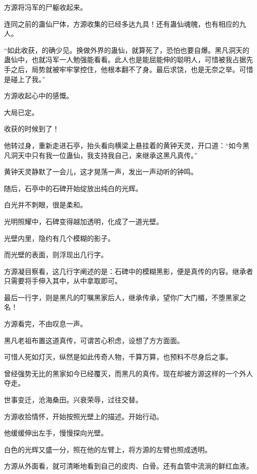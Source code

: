 
\begin{this_body}



方源将冯军的尸躯收起来。

连同之前的蛊仙尸体，方源收集的已经多达九具！还有蛊仙魂魄，也有相应的九人。

“如此收获，的确少见。换做外界的蛊仙，就算死了，恐怕也要自爆。黑凡洞天的蛊仙中，也就冯军一人勉强能看看。此人也是能屈能伸的聪明人，可惜被我占据先手之后，局势就被牢牢掌控住，他根本翻不了身。最后求饶，也是无奈之举。可惜是碰上了我。”

方源收起心中的感慨。

大局已定。

收获的时候到了！

他转过身，重新走进石亭，抬头看向横梁上悬挂着的黄钟天灵，开口道：“如今黑凡洞天中只有我一位蛊仙，我支持我自己，来继承这黑凡真传。”

黄钟天灵静默了一会儿，这才晃荡一声，发出一声动听的钟鸣。

随后，石亭中的石碑开始绽放出纯白的光辉。

白光并不刺眼，很是柔和。

光明照耀中，石碑变得越加透明，化成了一道光壁。

光壁内里，隐约有几个模糊的影子。

而光壁的表面，则浮现出几行字。

方源凝目察看，这几行字阐述的是：石碑中的模糊黑影，便是真传的内容。继承者只需要将手伸入其中，从中拿取即可。

最后一行字，则是黑凡的叮嘱黑家后人，继承传承，望你广大门楣，不堕黑家之名！

方源看完，不由叹息一声。

黑凡老祖布置这道真传，可谓苦心积虑，设想了方方面面。

可惜人死如灯灭，纵然是如此传奇人物，千算万算，也预料不尽身后之事。

曾经强势无比的黑家如今已经覆灭，而黑凡的真传。现在却被方源这样的一个外人夺走。

世事变迁，沧海桑田。兴衰荣辱，过往交替。

方源收拾情怀，开始按照光壁上的描述。开始行动。

他缓缓伸出左手，慢慢探向光壁。

白色的光辉又盛一分，照在他的左臂上，将方源的左臂也照成透明。

方源从外面看，就可清晰地看到自己的皮肉、白骨。还有血管中流淌的鲜红血液。


\end{this_body}

